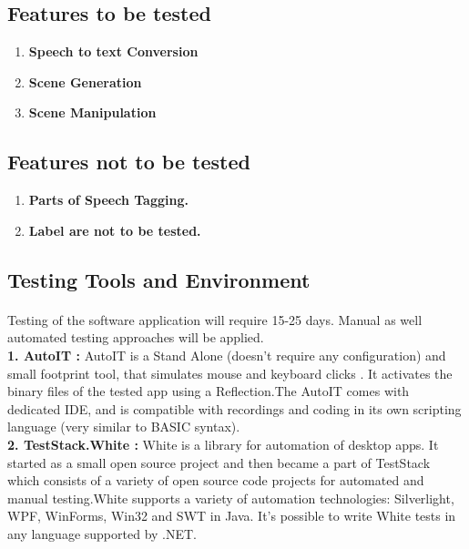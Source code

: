 \subsection{ Features to be tested }
\begin{enumerate}
\item \textbf{Speech to text Conversion}
\item \textbf{Scene Generation}
\item \textbf{Scene Manipulation }
\end{enumerate}

\subsection{Features not to be tested}
\begin{enumerate}
\item \textbf{Parts of Speech Tagging.}
\item \textbf{Label are not to be tested.}
\end{enumerate}

\subsection{Testing Tools and Environment}
\paragraph{}Testing of the software application will require 15-25 days. Manual as well automated testing approaches will be applied.\\
\textbf{1. AutoIT : }AutoIT is a Stand Alone (doesn’t require any configuration) and small footprint tool, that simulates mouse and keyboard clicks . It activates the binary files of the tested app using a Reflection.\linebreak The AutoIT comes with dedicated IDE, and is compatible with recordings and coding in its own scripting language (very similar to BASIC syntax). \\

\textbf{2. TestStack.White : }White is a library for automation of desktop apps. It started as a small open source project and then became a part of TestStack which consists of a variety of open source code projects for automated and manual testing.\linebreak White supports a variety of automation technologies: Silverlight, WPF, WinForms, Win32 and SWT in Java. It’s possible to write White tests in any language supported by .NET.\\

